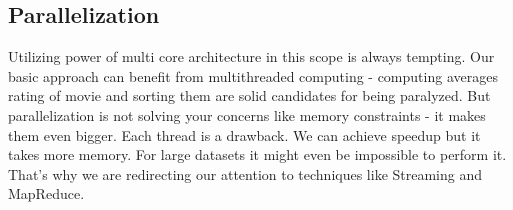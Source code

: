 \subsection{Parallelization}
Utilizing power of multi core architecture in this scope is always tempting.
Our basic approach can benefit from multithreaded computing - computing averages
rating of movie and sorting them are solid candidates for being paralyzed.
But parallelization is not solving your concerns like memory constraints - it makes
them even bigger. Each thread is a drawback. We can achieve speedup but it takes more
memory. For large datasets it might even be impossible to perform it. That's why we
are redirecting our attention to techniques like Streaming and MapReduce.


